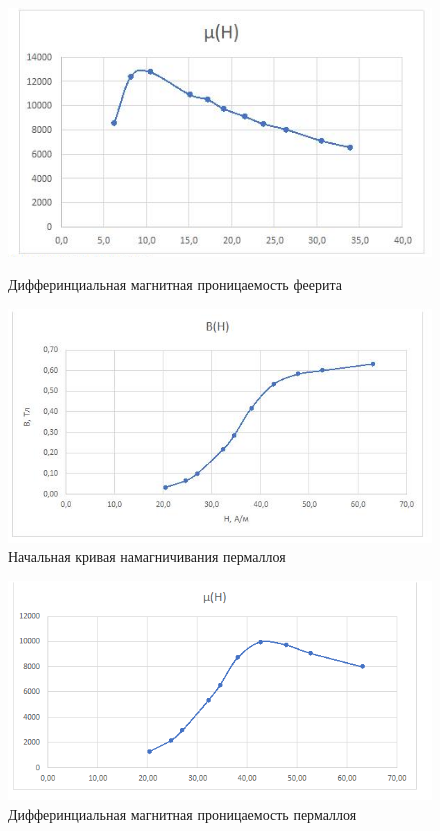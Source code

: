 \begin{figure}[H]
    \centering
    \includegraphics[scale=0.7]{феррит2.png}
    \caption{ Дифферинциальная магнитная проницаемость феерита}
    \label{fig:scheme}

    \centering
    \includegraphics[scale=0.7]{пермаллой1.png}
    \caption{ Начальная кривая намагничивания пермаллоя}
    \label{fig:scheme}
\end{figure}

\begin{figure}[H]
    \centering
    \includegraphics[scale=0.7]{пермаллой2.png}
    \caption{ Дифферинциальная магнитная проницаемость пермаллоя}
    \label{fig:scheme}
\end{figure}


\newpage

